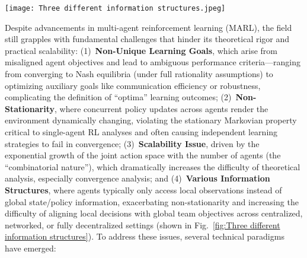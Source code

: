 \begin{figure*}[htbp]
    \centering %
    \texttt{[image: Three different information structures.jpeg]}
    \caption{
        In (a), a central controller uses global information to create and distribute policies (e.g., CTDE). This structure simplifies analysis in cooperative tasks but is unsuitable for non-cooperative ones.
        In (b), agents exchange information locally with neighbors without a central controller. This poses an intermediate challenge for theoretical analysis.
        In (c), Agents act independently using only local observations, with no communication. This is the most difficult to analyze, as it requires aligning local decisions with a global objective.
        Adapted from Fig.~2 in~\cite{zhangMultiAgentReinforcementLearning2021}, caption revised
    }\label{fig:Three different information structures}
\end{figure*}
Despite advancements in multi-agent reinforcement learning (MARL), the field still grapples with fundamental challenges that hinder its theoretical rigor and practical scalability:
(1)~\textbf{Non-Unique Learning Goals}, which arise from misaligned agent objectives and lead to ambiguous performance criteria—ranging from converging to Nash equilibria (under full rationality assumptions) to optimizing auxiliary goals like communication efficiency or robustness, complicating the definition of ``optima'' learning outcomes;
(2)~\textbf{Non-Stationarity}, where concurrent policy updates across agents render the environment dynamically changing, violating the stationary Markovian property critical to single-agent RL analyses and often causing independent learning strategies to fail in convergence;
(3)~\textbf{Scalability Issue}, driven by the exponential growth of the joint action space with the number of agents (the ``combinatorial nature''),  which dramatically increases the difficulty of theoretical analysis, especially convergence analysis;\@
and (4)~\textbf{Various Information Structures}, where agents typically only access local observations instead of global state/policy information, exacerbating non-stationarity and increasing the difficulty of aligning local decisions with global team objectives across centralized, networked, or fully decentralized settings (shown in Fig.~\ref{fig:Three different information structures})\cite{zhangMultiAgentReinforcementLearning2021}.
To address these issues, several technical paradigms have emerged:
